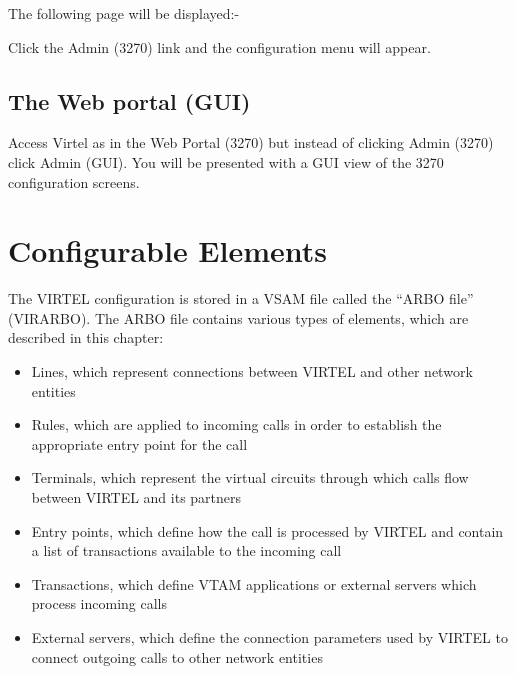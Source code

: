 \documentclass[letterpaper,10pt,english]{sphinxmanual}
\begin{document}
The following page will be displayed:-


Click the Admin (3270) link and the configuration menu will appear.


\newpage


\subsection{The Web portal (GUI)}
\label{\detokenize{connectivity_guide:the-web-portal-gui}}
Access Virtel as in the Web Portal (3270) but instead of clicking Admin (3270) click Admin (GUI). You will be presented with a GUI view of the 3270 configuration screens.


\newpage


\section{Configurable Elements}
\label{\detokenize{connectivity_guide:configurable-elements}}
The VIRTEL configuration is stored in a VSAM file called the “ARBO file” (VIRARBO). The ARBO file contains various types of elements, which are described in this chapter:
\begin{itemize}
\item {} 
Lines, which represent connections between VIRTEL and other network entities

\item {} 
Rules, which are applied to incoming calls in order to establish the appropriate entry point for the call

\item {} 
Terminals, which represent the virtual circuits through which calls flow between VIRTEL and its partners

\item {} 
Entry points, which define how the call is processed by VIRTEL and contain a list of transactions available to the incoming call

\item {} 
Transactions, which define VTAM applications or external servers which process incoming calls

\item {} 
External servers, which define the connection parameters used by VIRTEL to connect outgoing calls to other network entities

\end{itemize}
\end{document}
